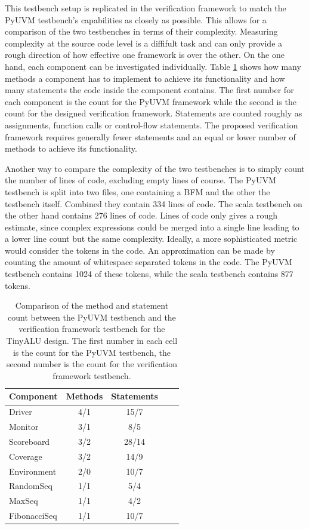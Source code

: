 This testbench setup is replicated in the verification framework to match the PyUVM testbench's capabilities as
closely as possible. This allows for a comparison of the two testbenches in terms of their complexity. Measuring
complexity at the source code level is a diffifult task and can only provide a rough direction of how effective one
framework is over the other. On the one hand, each component can be investigated individually. Table
\ref{tab:comparison} shows how many methods a component has to implement to achieve its functionality and how many
statements the code inside the component contains. The first number for each component is the count for the PyUVM
framework while the second is the count for the designed verification framework. Statements are counted roughly as
assignments, function calls or control-flow statements. The proposed verification framework requires generally fewer
statements and an equal or lower number of methods to achieve its functionality.

Another way to compare the complexity of the two testbenches is to simply count the number of lines of code,
excluding empty lines of course. The PyUVM testbench is split into two files, one containing a BFM and the other the
testbench itself. Combined they contain 334 lines of code. The scala testbench on the other hand contains 276 lines
of code. Lines of code only gives a rough estimate, since complex expressions could be merged into a single line
leading to a lower line count but the same complexity. Ideally, a more sophisticated metric would consider the tokens
in the code. An approximation can be made by counting the amount of whitespace separated tokens in the code. The
PyUVM testbench contains 1024 of these tokens, while the scala testbench contains 877 tokens.

\begin{table}
  \centering
  \begin{tabular}{|l|c|c|c|c|}
    \hline
    \textbf{Component}       & \textbf{Methods} & \textbf{Statements} \\ \hline
    Driver          & 4/1             & 15/7 \\ \hline
    Monitor         & 3/1             & 8/5    \\ \hline
    Scoreboard       & 3/2            & 28/14    \\ \hline
    Coverage      & 3/2             & 14/9      \\ \hline
    Environment        & 2/0             & 10/7    \\ \hline
    RandomSeq   & 1/1 & 5/4 \\ \hline
    MaxSeq   & 1/1 & 4/2 \\ \hline
    FibonacciSeq   & 1/1 & 10/7 \\ \hline
  \end{tabular}
  \caption{Comparison of the method and statement count between the PyUVM testbench and the verification framework
    testbench for the TinyALU design. The first number in each cell is the count for the PyUVM testbench, the second
  number is the count for the verification framework testbench.}
  \label{tab:comparison}
\end{table}

